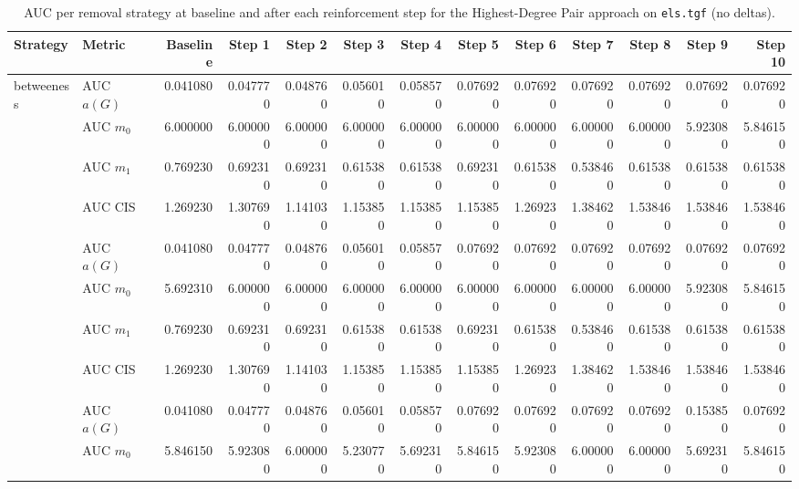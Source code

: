\begin{table}[htbp]
  \centering
  \caption{AUC per removal strategy at baseline and after each reinforcement step for the Highest-Degree Pair approach on \texttt{els.tgf} (no deltas).}
  \label{tab:els-highest_degree_pair-auc}
\setlength{\tabcolsep}{2.5pt}
  \begin{tabular}{llrrrrrrrrrrr}
    \toprule
    \textbf{Strategy} & \textbf{Metric} & \textbf{Baseline} & \textbf{Step 1} & \textbf{Step 2} & \textbf{Step 3} & \textbf{Step 4} & \textbf{Step 5} & \textbf{Step 6} & \textbf{Step 7} & \textbf{Step 8} & \textbf{Step 9} & \textbf{Step 10} \\
    \midrule
    \multirow{4}{*}{betweeness} & AUC $a(G)$ & 0.041080 & 0.047770 & 0.048760 & 0.056010 & 0.058570 & 0.076920 & 0.076920 & 0.076920 & 0.076920 & 0.076920 & 0.076920 \\
    & AUC $m_0$ & 6.000000 & 6.000000 & 6.000000 & 6.000000 & 6.000000 & 6.000000 & 6.000000 & 6.000000 & 6.000000 & 5.923080 & 5.846150 \\
    & AUC $m_1$ & 0.769230 & 0.692310 & 0.692310 & 0.615380 & 0.615380 & 0.692310 & 0.615380 & 0.538460 & 0.615380 & 0.615380 & 0.615380 \\
    & AUC CIS & 1.269230 & 1.307690 & 1.141030 & 1.153850 & 1.153850 & 1.153850 & 1.269230 & 1.384620 & 1.538460 & 1.538460 & 1.538460 \\
    \addlinespace
    \multirow{4}{*}{closeness} & AUC $a(G)$ & 0.041080 & 0.047770 & 0.048760 & 0.056010 & 0.058570 & 0.076920 & 0.076920 & 0.076920 & 0.076920 & 0.076920 & 0.076920 \\
    & AUC $m_0$ & 5.692310 & 6.000000 & 6.000000 & 6.000000 & 6.000000 & 6.000000 & 6.000000 & 6.000000 & 6.000000 & 5.923080 & 5.846150 \\
    & AUC $m_1$ & 0.769230 & 0.692310 & 0.692310 & 0.615380 & 0.615380 & 0.692310 & 0.615380 & 0.538460 & 0.615380 & 0.615380 & 0.615380 \\
    & AUC CIS & 1.269230 & 1.307690 & 1.141030 & 1.153850 & 1.153850 & 1.153850 & 1.269230 & 1.384620 & 1.538460 & 1.538460 & 1.538460 \\
    \addlinespace
    \multirow{4}{*}{core influence} & AUC $a(G)$ & 0.041080 & 0.047770 & 0.048760 & 0.056010 & 0.058570 & 0.076920 & 0.076920 & 0.076920 & 0.076920 & 0.153850 & 0.076920 \\
    & AUC $m_0$ & 5.846150 & 5.923080 & 6.000000 & 5.230770 & 5.692310 & 5.846150 & 5.923080 & 6.000000 & 6.000000 & 5.692310 & 5.846150 \\

\end{tabular}
\end{table}
